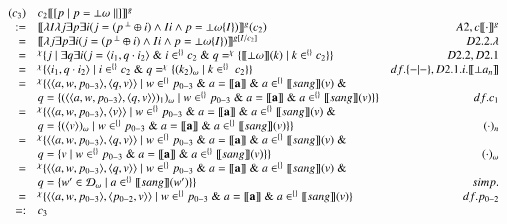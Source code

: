 \documentclass{article}
\renewcommand{\llbracket}{[\![}
\renewcommand{\rrbracket}{]\!]}
\newcommand{\bw}{\bot\omega}
\newcommand{\sang}{^{\{\}}\llbracket sang\rrbracket}
\begin{document}
\vspace{5mm}
$\begin{array}{rlr}
(c_3) & \multicolumn{2}{l}{c_2\llbracket [p\;|\;p=\bw\parallel]\rrbracket^g} \\
:= & \llbracket\lambda I\lambda j\exists p\exists i(j=(p \,^{\bot}\oplus i)\wedge Ii\wedge p=\bw\{I\})\rrbracket^g(c_2) & A2,c\llbracket\cdot\rrbracket^g \\
= & \llbracket\lambda j\exists p\exists i(j=(p \,^{\bot}\oplus i)\wedge Ii\wedge p=\bw\{I\})\rrbracket^{g[I/c_2]} & D2.2.\lambda \\
= & ^{\chi}\{j\;|\;\exists q\exists i(j=\langle i_1,q\cdot i_2\rangle \;\&\; i\in ^{\{\}}c_2 \;\&\; q= ^{\chi}\{\llbracket\bw\rrbracket(k)\;|\;k\in ^{\{\}}c_2\}\} & D2.2,D2.1 \\
= & ^{\chi}\{\langle i_1,q\cdot i_2\rangle\;|\;i\in ^{\{\}}c_2 \;\&\; q= ^{\chi}\{(k_2)_{\omega}\;|\;k\in ^{\{\}}~c_2\}\} & df.\{-|-\}, D2.1.i.\llbracket\bot a_n\rrbracket \\
= & ^{\chi}\{\langle\langle a,w,p_{0-3}\rangle,\langle q,v\rangle\rangle \;|\;w\in ^{\{\}}p_{0-3}\;\&\; a=\llbracket\mathbf{a}\rrbracket\;\&\; a\in \sang(v) \;\&\; & \\
& q=\{(\langle\langle a,w,p_{0-3}\rangle,\langle q,v\rangle\rangle)_1)_{\omega}\;|\; w\in ^{\{\}}p_{0-3}\;\&\; a=\llbracket\mathbf{a}\rrbracket\;\&\; a\in \sang(v)\}\} & df. c_1 \\
= & ^{\chi}\{\langle\langle a,w,p_{0-3}\rangle,\langle v\rangle\rangle \;|\;w\in ^{\{\}}p_{0-3}\;\&\; a=\llbracket\mathbf{a}\rrbracket\;\&\; a\in \sang(v) \;\&\;& \\
& q=\{(\langle v\rangle)_{\omega}\;|\; w\in ^{\{\}}p_{0-3}\;\&\; a=\llbracket\mathbf{a}\rrbracket\;\&\; a\in \sang(v)\}\} & (\cdot)_n \\
= & ^{\chi}\{\langle\langle a,w,p_{0-3}\rangle,\langle q,v\rangle\rangle \;|\;w\in ^{\{\}}p_{0-3}\;\&\; a=\llbracket\mathbf{a}\rrbracket\;\&\; a\in \sang(v) \;\&\;& \\
& q=\{v\;|\; w\in ^{\{\}}p_{0-3}\;\&\; a=\llbracket\mathbf{a}\rrbracket\;\&\; a\in \sang(v)\}\} & (\cdot)_{\omega} \\
= & ^{\chi}\{\langle\langle a,w,p_{0-3}\rangle,\langle q,v\rangle\rangle \;|\;w\in ^{\{\}}p_{0-3}\;\&\; a=\llbracket\mathbf{a}\rrbracket\;\&\; a\in \sang(v)\;\&\; & \\
& q=\{w'\in\mathcal{D}_{\omega}\;|\; a\in \sang(w')\}\} & simp. \\
= & ^{\chi}\{\langle\langle a,w,p_{0-3}\rangle,\langle p_{0-2},v\rangle\rangle \;|\;w\in ^{\{\}}p_{0-3}\;\&\; a=\llbracket\mathbf{a}\rrbracket\;\&\;a\in \sang(v)\} & df. p_{0-2} \\
=: & c_3 & \\
\end{array}$
\end{document}
